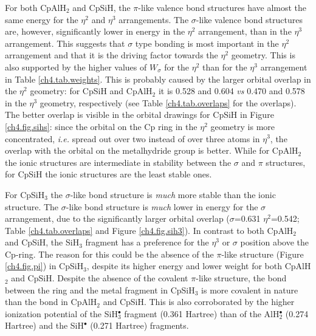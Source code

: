For both CpAlH$_2$ and CpSiH, the $\pi$-like valence bond structures have almost the same energy for the $\eta^{2}$ and $\eta^{3}$ arrangements. The $\sigma$-like valence bond structures are, however, significantly lower in energy in the $\eta^{2}$ arrangement, than in the $\eta^{3}$ arrangement. This suggests that $\sigma$ type bonding is most important in the $\eta^2$ arrangement and that it is the driving factor towards the $\eta^2$ geometry. This is also supported by the higher values of $W_\sigma$ for the $\eta^2$ than for the $\eta^3$ arrangement in Table \ref{ch4.tab.weights}. This is probably caused by the larger orbital overlap in the $\eta^2$ geometry: for CpSiH and CpAlH$_2$ it is 0.528 and 0.604 \textit{vs} 0.470 and 0.578 in the $\eta^3$ geometry, respectively (see Table \ref{ch4.tab.overlaps} for the overlaps). The better overlap is visible in the orbital drawings for CpSiH in Figure \ref{ch4.fig.sihs}: since the orbital on the Cp ring in the $\eta^2$ geometry is more concentrated, \textit{i.e.} spread out over two instead of over three atoms in $\eta^3$, the overlap with the orbital on the metalhydride group is better. While for CpAlH$_2$ the ionic structures are intermediate in stability between the $\sigma$ and $\pi$ structures, for CpSiH the ionic structures are the least stable ones.

For CpSiH$_3$ the $\sigma$-like bond structure is \textit{much} more stable than the ionic structure. The $\sigma$-like bond structure is \textit{much} lower in energy for the $\sigma$ arrangement, due to the significantly larger orbital overlap ($\sigma$=0.631 $\eta^2$=0.542; Table \ref{ch4.tab.overlaps} and Figure \ref{ch4.fig.sih3}). In contrast to both CpAlH$_2$ and CpSiH, the SiH$_3$ fragment has a preference for the $\eta^3$ or $\sigma$ position above the Cp-ring. The reason for this could be the absence of the $\pi$-like structure (Figure \ref{ch4.fig.pi}) in CpSiH$_3$, despite its higher energy and lower weight for both CpAlH$_2$ and CpSiH. Despite the absence of the covalent $\pi$-like structure, the bond between the ring and the metal fragment in CpSiH$_3$ is more covalent in nature than the bond in CpAlH$_2$ and CpSiH. This is also corroborated by the higher ionization potential of the SiH$_3^{\bullet}$ fragment (0.361 Hartree) than of the AlH$_2^{\bullet}$ (0.274 Hartree) and the SiH$^{\bullet}$ (0.271 Hartree) fragments.

